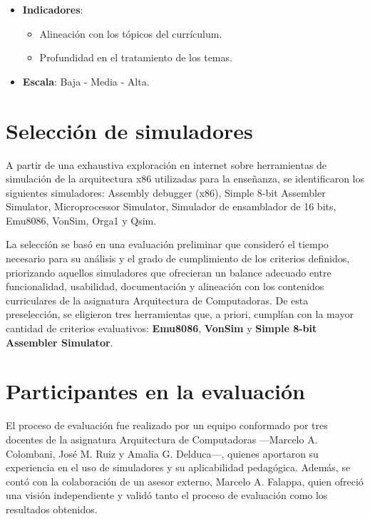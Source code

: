 \documentclass[12pt,oneside]{templates/unerthesis}
\providecommand{\tightlist}{%
  \setlength{\itemsep}{0pt}\setlength{\parskip}{0pt}}
\begin{document}
\begin{itemize}
  \begin{itemize}
  \tightlist
  \item
    \textbf{Indicadores}:

    \begin{itemize}
    \tightlist
    \item
      Alineación con los tópicos del currículum.
    \item
      Profundidad en el tratamiento de los temas.
    \end{itemize}
  \item
    \textbf{Escala}: Baja - Media - Alta.
  \end{itemize}
\end{itemize}

\hypertarget{selecciuxf3n-de-simuladores}{%
\section{Selección de simuladores}\label{selecciuxf3n-de-simuladores}}

A partir de una exhaustiva exploración en internet sobre herramientas de simulación de la arquitectura x86 utilizadas para la enseñanza, se identificaron los siguientes simuladores: Assembly debugger (x86), Simple 8-bit Assembler Simulator, Microprocessor Simulator, Simulador de ensamblador de 16 bits, Emu8086, VonSim, Orga1 y Qsim.

La selección se basó en una evaluación preliminar que consideró el tiempo necesario para su análisis y el grado de cumplimiento de los criterios definidos, priorizando aquellos simuladores que ofrecieran un balance adecuado entre funcionalidad, usabilidad, documentación y alineación con los contenidos curriculares de la asignatura Arquitectura de Computadoras. De esta preselección, se eligieron tres herramientas que, a priori, cumplían con la mayor cantidad de criterios evaluativos: \textbf{Emu8086}, \textbf{VonSim} y \textbf{Simple 8-bit Assembler Simulator}.

\hypertarget{participantes-en-la-evaluaciuxf3n}{%
\section{Participantes en la evaluación}\label{participantes-en-la-evaluaciuxf3n}}

El proceso de evaluación fue realizado por un equipo conformado por tres docentes de la asignatura Arquitectura de Computadoras ---Marcelo A. Colombani, José M. Ruiz y Amalia G. Delduca---, quienes aportaron su experiencia en el uso de simuladores y su aplicabilidad pedagógica. Además, se contó con la colaboración de un asesor externo, Marcelo A. Falappa, quien ofreció una visión independiente y validó tanto el proceso de evaluación como los resultados obtenidos.
\end{document}
